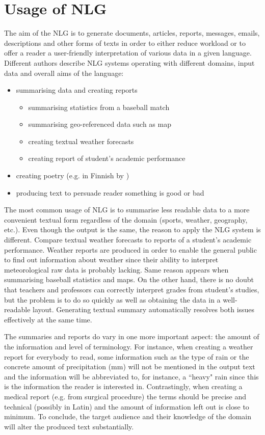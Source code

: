 \section{Usage of NLG}
The aim of the NLG is to generate documents, articles, reports, messages, emails, descriptions and other forms of texts in order to either reduce workload or to offer a reader a user-friendly interpretation of various data in a given language. Different authors describe NLG systems operating with different domains, input data and overall aims of the language:
\begin{itemize}
	\item summarising data and creating reports 
	\begin{itemize}
		\item summarising statistics from a baseball match \citep{puduppully2022data}
		\item summarising geo-referenced data such as map \citep{thomas2007atlas}
		\item creating textual weather forecasts \citep{sripada2014case}
		\item creating report of student's academic performance \citep{araujo2010sinotas}
	\end{itemize}
	\item creating poetry (e.g. in Finnish by \citet{hamalainen2018harnessing})
	\item producing text to persuade reader something is good or bad \citep{carenini2006generating}
\end{itemize}

The most common usage of NLG is to summarise less readable data to a more convenient textual form regardless of the domain (sports, weather, geography, etc.). Even though the output is the same, the reason to apply the NLG system is different. Compare textual weather forecasts to reports of a student's academic performance. Weather reports are produced in order to enable the general public to find out information about weather since their ability to interpret meteorological raw data is probably lacking. Same reason appears when summarising baseball statistics and maps. On the other hand, there is no doubt that teachers and professors can correctly interpret grades from student’s studies, but the problem is to do so quickly as well as obtaining the data in a well-readable layout. Generating textual summary automatically resolves both issues effectively at the same time.

The summaries and reports do vary in one more important aspect: the amount of the information and level of terminology. For instance, when creating a weather report for everybody to read,  some information such as the type of rain or the concrete amount of  precipitation (mm) will not be mentioned in the output text and the information will be abbreviated to, for instance, a ``heavy" rain since this is the information the reader is interested in. Contrastingly, when creating a medical report (e.g. from surgical procedure) the terms should be precise and technical (possibly in Latin) and the amount of information left out is close to minimum. To conclude, the target audience and their knowledge of the domain will alter the produced text substantially.


